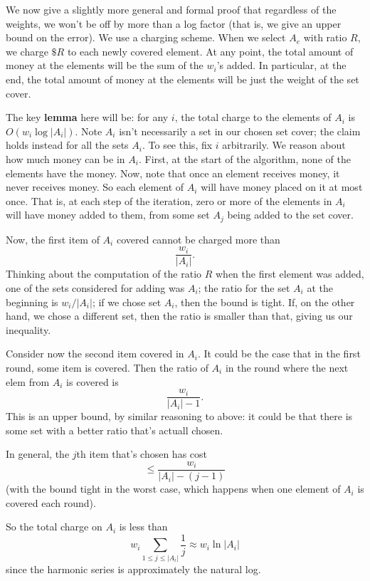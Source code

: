 \documentclass{article}
\begin{document}
We now give a slightly more general and formal proof that regardless of the
weights, we won't be off by more than a log factor (that is, we give an upper
bound on the error).
We use a charging scheme.
When we select $A_e$ with ratio $R$, we charge $\$R$ to each newly
covered element.
At any point, the total amount of money at the elements will be the sum of
the $w_i$'s added.
In particular, at the end, the total amount of money at the elements will
be just the weight of the set cover.

The key \textbf{lemma} here will be: for any $i$, the total charge to the 
elements of
$A_i$ is $O(w_i \log|A_i|)$.
Note $A_i$ isn't necessarily a set in our chosen set cover; the claim holds
instead for all the sets $A_i$.
To see this, fix $i$ arbitrarily.
We reason about how much money can be in $A_i$.
First, at the start of the algorithm, none of the elements have the money.
Now, note that once an element receives money, it never receives money.
So each element of $A_i$ will have money placed on it at most once.
That is, at each step of the iteration, zero or more of the elements in 
$A_i$ will have money added to them, from some set $A_j$ being added
to the set cover.

Now, the first item of $A_i$ covered cannot be charged more than
$$
\frac{w_i}{|A_i|}.
$$
Thinking about the computation of the ratio $R$ when the first element
was added, one of the sets considered for adding was $A_i$; the ratio for
the set $A_i$ at the beginning is $w_i / |A_i|$; if we chose set $A_i$, then
the bound is tight. If, on the other hand, we chose a different set, then
the ratio is smaller than that, giving us our inequality.

Consider now the second item covered in $A_i$. It could be the case that in the
first round, some item is covered. Then the ratio of $A_i$ in the round
where the next elem from $A_i$ is covered is
$$
\frac{w_i}{|A_i| - 1}.
$$
This is an upper bound, by similar reasoning to above: it could be that there
is some set with a better ratio that's actuall chosen.

In general, the $j$th item that's chosen has cost
$$
\leq \frac{w_i}  {|A_i| - (j - 1)}
$$
(with the bound tight in the worst case, which happens when one element of
$A_i$ is covered each round).

So the total charge on $A_i$ is less than
$$
w_i\sum_{1 \leq j \leq |A_i|} \frac{1}{j}
\approx
w_i \ln |A_i|
$$
since the harmonic series is approximately the natural log.
\end{document}
